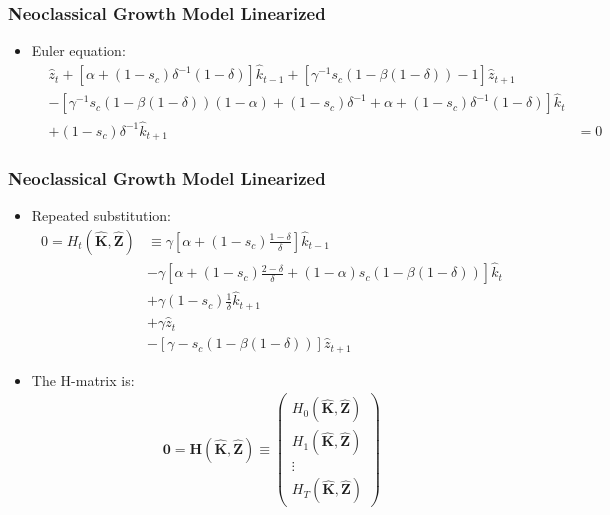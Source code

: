 \documentclass[english,xcolor=svgnames]{beamer}
\begin{document}
   \begin{frame}
	\frametitle{Neoclassical Growth Model Linearized}
	\begin{itemize}
		\item Euler equation:
		\begin{align*}
			 &\hat{z}_t + [\alpha + (1-s_c)\delta^{-1}(1-\delta)] \hat{k}_{t-1}   + \left[\gamma^{-1} s_c(1 - \beta(1-\delta))-1\right] \hat{z}_{t+1} \\
			 &- \left[\gamma^{-1} s_c(1 - \beta(1-\delta))(1-\alpha) + (1-s_c)\delta^{-1} + \alpha + (1-s_c)\delta^{-1}(1-\delta)\right] \hat{k}_t \\
			 &  + (1-s_c)\delta^{-1}\hat{k}_{t+1}
			 &= 0
		\end{align*}
	 \end{itemize}
 \end{frame}

\begin{frame}
	\frametitle{Neoclassical Growth Model Linearized}
	\begin{itemize}
		\item Repeated substitution:
		\begin{align*}
			0=H_t(\mathbf{\hat{K}},\mathbf{\hat{Z}})&\equiv  \gamma\left[\alpha + (1-s_c)\frac{1-\delta}{\delta}\right]\hat{k}_{t-1} \\
			&-\gamma \left[\alpha + (1-s_c)\frac{2-\delta}{\delta}+(1-\alpha)s_c(1 - \beta(1-\delta))\right]\hat{k}_{t} \\
			&   +\gamma  (1-s_c)\frac{1}{\delta}\hat{k}_{t+1} \\
			&+ \gamma \hat{z}_t \\
			& -\left[\gamma-s_c(1 - \beta(1-\delta)) \right]  \hat{z}_{t+1} 
		\end{align*}
	 \item The H-matrix is:
		\begin{align*}
			\mathbf{0} = \mathbf{H}(\mathbf{\hat{K}},\mathbf{\hat{Z}}) \equiv \begin{pmatrix}
				H_0(\mathbf{\hat{K}},\mathbf{\hat{Z}}) \\
				H_1(\mathbf{\hat{K}},\mathbf{\hat{Z}}) \\
				\vdots \\
				H_T(\mathbf{\hat{K}},\mathbf{\hat{Z}})
			\end{pmatrix}
		\end{align*}
		\end{itemize}
 \end{frame}
\end{document}
